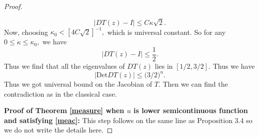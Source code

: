 \documentclass{amsart}
\theoremstyle{plain}
\numberwithin{equation}{section}
\begin{document}
\begin{proof}
\begin{enumerate}
\begin{equation}\label{chnab}
|DT(z)-I|\leq C\kappa\sqrt{2}.
\end{equation}
Now, choosing $\kappa_{0}<[4C\sqrt{2}]^{-1},$ which is universal constant. So for any $0\leq\kappa\leq\kappa_{0},$ we have 
\[|DT(z)-I|\leq\frac{1}{2}.\]
Thus we find that all the eigenvalues of $DT(z)$ lies in $[1/2,3/2].$ Thus we have 
\begin{equation*}
|\text{Det}DT(z)|\leq \big(3/2\big)^{n}.  
\end{equation*}
Thus we got universal bound on the Jacobian of $T.$ Then we can find the contradiction as in the classical case.
\end{enumerate}
\textbf{Proof of Theorem \eqref{measure} when $u$ is lower semicontinuous function and satisfying \eqref{meac}:} This step follows on the same line as Proposition 3.4\cite{imbert2016estimates} so we do not write the details here.
\end{proof}
\end{document}
